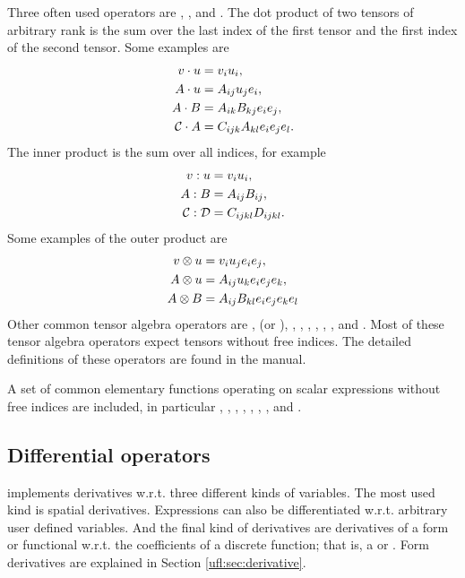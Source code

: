 Three often used operators are , ,
and .  The dot product of two tensors of arbitrary
rank is the sum over the last index of the first tensor and the first
index of the second tensor.  Some examples are
\begin{align}
{v} \cdot {u} &= v_i u_i, \\
{A} \cdot {u} &= A_{ij} u_j {e}_i, \\
{A} \cdot {B} &= A_{ik} B_{kj} {e}_i {e}_j, \\
\mathcal{C} \cdot {A} &= C_{ijk} A_{kl} {e}_i {e}_j {e}_l.
\end{align}
The inner product is the sum over all indices, for example
\begin{align}
{v} : {u} &= v_i u_i, \\
{A} : {B} &= A_{ij} B_{ij}, \\
\mathcal{C} : \mathcal{D} &= C_{ijkl} D_{ijkl}.
\end{align}
Some examples of the outer product are
\begin{align}
{v} \otimes {u} &= v_i u_j {e}_i {e}_j, \\
{A} \otimes {u} &= A_{ij} u_k {e}_i {e}_j {e}_k, \\
{A} \otimes {B} &= A_{ij} B_{kl} {e}_i {e}_j {e}_k {e}_l
\end{align}
Other common tensor algebra operators are ,
 (or ), , ,
, , , , and
. Most of these tensor algebra operators expect tensors
without free indices. The detailed definitions of these operators are
found in the manual.

A set of common elementary functions operating on scalar expressions
without free indices are included, in particular , , , , , , ,
and .

\subsection{Differential operators} \label{ufl:sec:differential}
\index{$\nabla$}

\ufl{} implements derivatives w.r.t. three different kinds of variables.
The most used kind is spatial derivatives.  Expressions can also be
differentiated w.r.t. arbitrary user defined variables.  And the final
kind of derivatives are derivatives of a form or functional w.r.t. the
coefficients of a discrete function; that is, a 
or .  Form derivatives are explained in Section
\ref{ufl:sec:derivative}.

